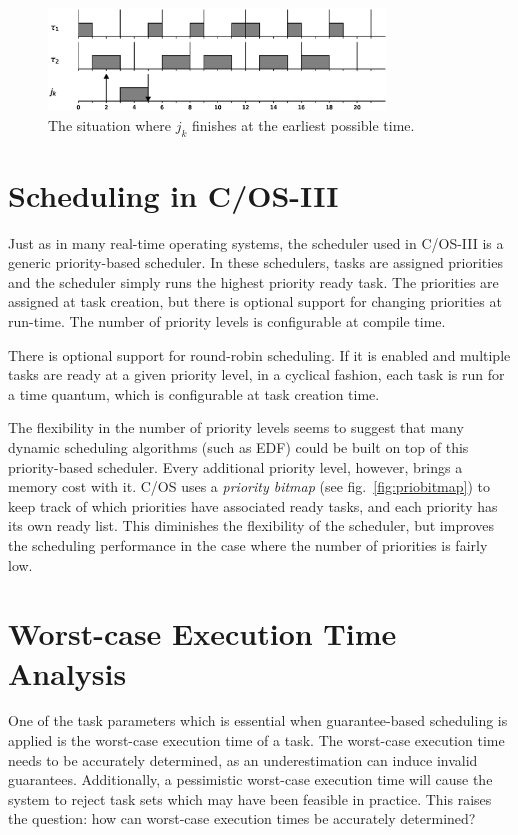 \documentclass[twoside]{uva-inf-bachelor-thesis}
\newcommand{\ucosiii}{\textmu C/OS-III\xspace}
\newcommand{\ucos}{\textmu C/OS\xspace}
\begin{document}
\begin{figure}[htpb]
    \centering
    \includegraphics[width=0.8\textwidth]{optimaldeadline.eps}
    \caption{The situation where $j_k$ finishes at the earliest possible time.}
    \label{fig:tbsoptimaldeadline}
\end{figure}

\section{Scheduling in \ucosiii}
Just as in many real-time operating systems, the scheduler used in \ucosiii is a generic priority-based scheduler. In these schedulers, tasks are assigned priorities and the scheduler simply runs the highest priority ready task. The priorities are assigned at task creation, but there is optional support for changing priorities at run-time. The number of priority levels is configurable at compile time.

There is optional support for round-robin scheduling. If it is enabled and multiple tasks are ready at a given priority level, in a cyclical fashion, each task is run for a time quantum, which is configurable at task creation time.

The flexibility in the number of priority levels seems to suggest that many dynamic scheduling algorithms (such as EDF) could be built on top of this priority-based scheduler. Every additional priority level, however, brings a memory cost with it. \ucos uses a \textit{priority bitmap} (see fig.~\ref{fig:priobitmap}) to keep track of which priorities have associated ready tasks, and each priority has its own ready list. This diminishes the flexibility of the scheduler, but improves the scheduling performance in the case where the number of priorities is fairly low.

\section{Worst-case Execution Time Analysis}
One of the task parameters which is essential when guarantee-based scheduling is applied is the worst-case execution time of a task. The worst-case execution time needs to be accurately determined, as an underestimation can induce invalid guarantees. Additionally, a pessimistic worst-case execution time will cause the system to reject task sets which may have been feasible in practice. This raises the question: how can worst-case execution times be accurately determined?
\end{document}
